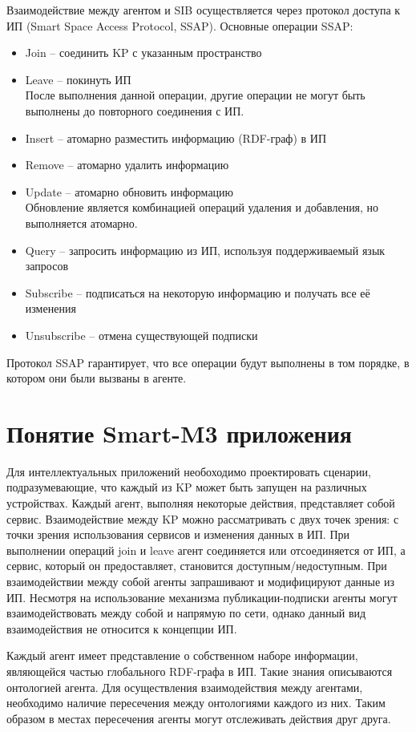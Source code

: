 Взаимодействие между агентом и SIB осуществляется через протокол доступа к ИП (Smart Space Access Protocol, SSAP). Основные операции SSAP:
\begin{itemize}
\item
Join -- соединить KP с указанным пространство
\item
Leave -- покинуть ИП\\
После выполнения данной операции, другие операции не могут быть выполнены до повторного соединения с ИП.
\item
Insert -- атомарно разместить информацию (RDF-граф) в ИП
\item
Remove -- атомарно удалить информацию
\item
Update -- атомарно обновить информацию\\
Обновление является комбинацией операций удаления и добавления, но выполняется атомарно.
\item
Query -- запросить информацию из ИП, используя поддерживаемый язык запросов
\item
Subscribe -- подписаться на некоторую информацию и получать все её изменения
\item
Unsubscribe -- отмена существующей подписки
\end{itemize}
Протокол SSAP гарантирует, что все операции будут выполнены в том порядке, в котором они были вызваны в агенте.

\section{Понятие Smart-M3 приложения}

Для интеллектуальных приложений необоходимо проектировать сценарии, подразумевающие, что каждый из KP может быть запущен на различных устройствах. Каждый агент, выполняя некоторые действия, представляет собой сервис. Взаимодействие между KP можно рассматривать с двух точек зрения: с точки зрения использования сервисов и изменения данных в ИП. При выполнении операций join и leave агент соединяется или отсоединяется от ИП, а сервис, который он предоставляет, становится доступным/недоступным. При взаимодействии между собой агенты запрашивают и модифицируют данные из ИП. Несмотря на использование механизма публикации-подписки агенты могут взаимодействовать между собой и напрямую по сети, однако данный вид взаимодействия не относится к концепции ИП.

Каждый агент имеет представление о собственном наборе информации, являющейся частью глобального RDF-графа в ИП. Такие знания описываются 
онтологией агента. Для осуществления взаимодействия между агентами, необходимо наличие пересечения между онтологиями каждого из них. Таким образом в местах пересечения агенты могут отслеживать действия друг друга.

